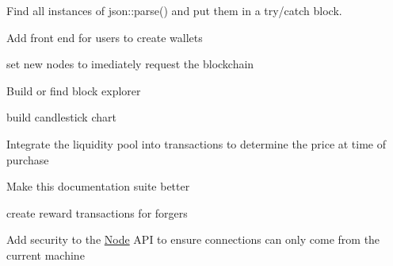 
\begin{DoxyItemize}
\item Find all instances of json\+::parse() and put them in a try/catch block.
\item Add front end for users to create wallets
\item set new nodes to imediately request the blockchain
\item Build or find block explorer
\item build candlestick chart
\item Integrate the liquidity pool into transactions to determine the price at time of purchase
\item Make this documentation suite better
\item create reward transactions for forgers
\item Add security to the \mbox{\hyperlink{class_node}{Node}} API to ensure connections can only come from the current machine 
\end{DoxyItemize}
